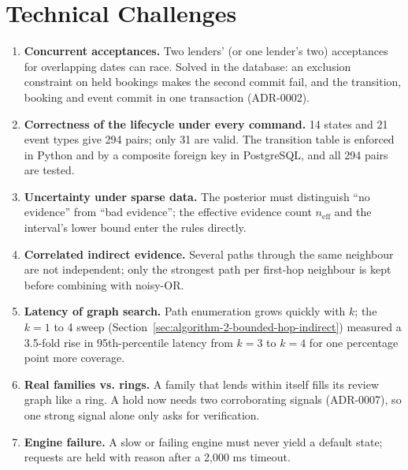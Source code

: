 \section{Technical Challenges}\label{sec:technical-challenges}
\begin{enumerate}
\item \textbf{Concurrent acceptances.} Two lenders' (or one lender's two) acceptances for overlapping dates can race. Solved in the database: an exclusion constraint on held bookings makes the second commit fail, and the transition, booking and event commit in one transaction (ADR-0002).
\item \textbf{Correctness of the lifecycle under every command.} 14 states and 21 event types give 294 pairs; only 31 are valid. The transition table is enforced in Python and by a composite foreign key in PostgreSQL, and all 294 pairs are tested.
\item \textbf{Uncertainty under sparse data.} The posterior must distinguish ``no evidence'' from ``bad evidence''; the effective evidence count $n_{\mathrm{eff}}$ and the interval's lower bound enter the rules directly.
\item \textbf{Correlated indirect evidence.} Several paths through the same neighbour are not independent; only the strongest path per first-hop neighbour is kept before combining with noisy-OR.
\item \textbf{Latency of graph search.} Path enumeration grows quickly with $k$; the $k=1$ to 4 sweep (Section~\ref{sec:algorithm-2-bounded-hop-indirect}) measured a 3.5-fold rise in 95th-percentile latency from $k=3$ to $k=4$ for one percentage point more coverage.
\item \textbf{Real families vs. rings.} A family that lends within itself fills its review graph like a ring. A hold now needs two corroborating signals (ADR-0007), so one strong signal alone only asks for verification.
\item \textbf{Engine failure.} A slow or failing engine must never yield a default state; requests are held with reason  after a 2,000 ms timeout.
\end{enumerate}

